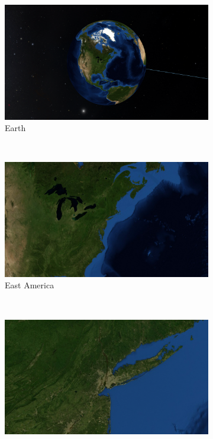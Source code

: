 \begin{figure}[h]
    \centering
    \begin{subfigure}[bt]{0.31\textwidth}
        \includegraphics[width=\textwidth]{figures/results/topdown/topdown5.png}
        \caption{Earth}
    \end{subfigure}
    ~
    \begin{subfigure}[bt]{0.31\textwidth}
        \includegraphics[width=\textwidth]{figures/results/topdown/topdown4.png}
        \caption{East America}
    \end{subfigure}
    ~
    \begin{subfigure}[bt]{0.31\textwidth}
        \includegraphics[width=\textwidth]{figures/results/topdown/topdown3.png}

\end{subfigure}
\end{figure}
